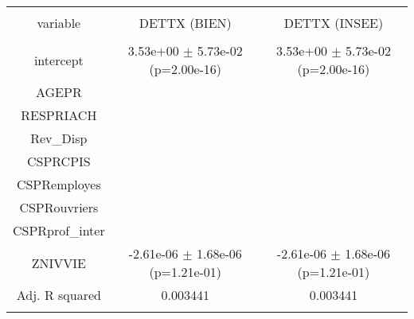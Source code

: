 \documentclass{article}
\begin{document}
\begin{table}[!htbp] \centering 
  \caption{} 
  \label{} 
\begin{tabular}{@{\extracolsep{5pt}} ccc} 
\\[-1.8ex]\hline 
\hline \\[-1.8ex] 
variable & DETTX (BIEN) & DETTX (INSEE) \\ 
\hline \\[-1.8ex] 
intercept &  3.53e+00 $\pm$ 5.73e-02 (p=2.00e-16) &  3.53e+00 $\pm$ 5.73e-02 (p=2.00e-16) \\ 
AGEPR &  &  \\ 
RESPRIACH &  &  \\ 
Rev\_Disp &  &  \\ 
CSPRCPIS &  &  \\ 
CSPRemployes &  &  \\ 
CSPRouvriers &  &  \\ 
CSPRprof\_inter &  &  \\ 
ZNIVVIE & -2.61e-06 $\pm$ 1.68e-06 (p=1.21e-01) & -2.61e-06 $\pm$ 1.68e-06 (p=1.21e-01) \\ 
\hline Adj. R squared & 0.003441 & 0.003441 \\ 
\hline \\[-1.8ex] 
\end{tabular} 
\end{table} 
\end{document}
